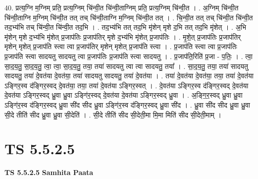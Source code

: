 \documentclass[17pt]{extarticle}
\begin{document}
40. प्रत्य॒ग्नि म॒ग्निम् प्रति॒ प्रत्य॒ग्निम् चि॑न्वी॒त चि॑न्वी॒ताग्निम् प्रति॒ प्रत्य॒ग्निम् चि॑न्वी॒त । . अ॒ग्निम् चि॑न्वी॒त चि॑न्वी॒ताग्नि म॒ग्निम् चि॑न्वी॒त तत् तच् चि॑न्वी॒ताग्नि म॒ग्निम् चि॑न्वी॒त तत् । . चि॒न्वी॒त तत् तच् चि॑न्वी॒त चि॑न्वी॒त तद॒भ्य॑भि तच् चि॑न्वी॒त चि॑न्वी॒त तद॒भि । . तद॒भ्य॑भि तत् तद॒भि मृ॑शेन् मृशे द॒भि तत् तद॒भि मृ॑शेत् । . अ॒भि मृ॑शेन् मृशे द॒भ्य॑भि मृ॑शेत् प्र॒जाप॑तिः प्र॒जाप॑तिर् मृशे द॒भ्य॑भि मृ॑शेत् प्र॒जाप॑तिः । . मृ॒शे॒त् प्र॒जाप॑तिः प्र॒जाप॑तिर् मृशेन् मृशेत् प्र॒जाप॑ति स्त्वा त्वा प्र॒जाप॑तिर् मृशेन् मृशेत् प्र॒जाप॑ति स्त्वा । . प्र॒जाप॑ति स्त्वा त्वा प्र॒जाप॑तिः प्र॒जाप॑ति स्त्वा सादयतु सादयतु त्वा प्र॒जाप॑तिः प्र॒जाप॑ति स्त्वा सादयतु । . प्र॒जाप॑ति॒रिति॑ प्र॒जा - प॒तिः॒ । . त्वा॒ सा॒द॒य॒तु॒ सा॒द॒य॒तु॒ त्वा॒ त्वा॒ सा॒द॒य॒तु॒ तया॒ तया॑ सादयतु त्वा त्वा सादयतु॒ तया᳚ । . सा॒द॒य॒तु॒ तया॒ तया॑ सादयतु सादयतु॒ तया॑ दे॒वत॑या दे॒वत॑या॒ तया॑ सादयतु सादयतु॒ तया॑ दे॒वत॑या । . तया॑ दे॒वत॑या दे॒वत॑या॒ तया॒ तया॑ दे॒वत॑या ऽङ्गिर॒स्व द॑ङ्गिर॒स्वद् दे॒वत॑या॒ तया॒ तया॑ दे॒वत॑या ऽङ्गिर॒स्वत् । . दे॒वत॑या ऽङ्गिर॒स्व द॑ङ्गिर॒स्वद् दे॒वत॑या दे॒वत॑या ऽङ्गिर॒स्वद् ध्रु॒वा ध्रु॒वा ऽङ्गि॑र॒स्वद् दे॒वत॑या दे॒वत॑या ऽङ्गिर॒स्वद् ध्रु॒वा । . अ॒ङ्गि॒र॒स्वद् ध्रु॒वा ध्रु॒वा ऽङ्गि॑र॒स्व द॑ङ्गिर॒स्वद् ध्रु॒वा सी॑द सीद ध्रु॒वा ऽङ्गि॑र॒स्व द॑ङ्गिर॒स्वद् ध्रु॒वा सी॑द । . ध्रु॒वा सी॑द सीद ध्रु॒वा ध्रु॒वा सी॒दे तीति॑ सीद ध्रु॒वा ध्रु॒वा सी॒देति॑ । . सी॒दे तीति॑ सीद सी॒देती॒मा मि॒मा मिति॑ सीद सी॒देती॒माम् । \newline
\pagebreak
{}

\section{ TS 5.5.2.5 }

\textbf{TS 5.5.2.5 } \newline
\textbf{Samhita Paata} \newline
\end{document}
